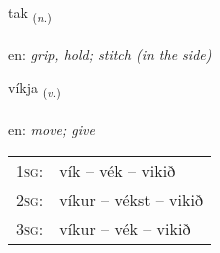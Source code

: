 \documentclass[frontgrid, backgrid]{flacards}\usepackage[]{graphicx}\usepackage[]{color}
\begin{document}
\renewcommand{\flhead}{\vskip5pt \fboxsep=0pt {\small\bfseries\footnotesize Nafnorð | Noun}}
\renewcommand{\fcfoot}{\vskip5pt \fboxsep=0pt \hspace{2pt}{\small\bfseries\footnotesize 2K}}

\renewcommand{\blhead}{\vskip5pt {\small\bfseries\footnotesize Nafnorð | Noun }}
\renewcommand{\bcfoot}{\vskip5pt \hspace{2pt}{\small\bfseries\footnotesize 2K}}


{tak \small{\textsubscript{(\textit{n.})}} \\[1ex] %
\textphonetic{[tʰaːk]} \\
en: \emph{grip, hold; stitch (in the side)} \\  [2ex]
\renewcommand*{\arraystretch}{0.8}
}

\renewcommand{\flhead}{\vskip5pt \fboxsep=0pt {\small\bfseries\footnotesize Sagnorð | Verb}}
\renewcommand{\fcfoot}{\vskip5pt \fboxsep=0pt \hspace{2pt}{\small\bfseries\footnotesize 2K}}

\renewcommand{\blhead}{\vskip5pt {\small\bfseries\footnotesize Sagnorð | Verb }}
\renewcommand{\bcfoot}{\vskip5pt \hspace{2pt}{\small\bfseries\footnotesize 2K}}


{víkja \small{\textsubscript{(\textit{v.})}} \\[1ex] %
\textphonetic{[viːca]} \\
en: \emph{move; give} \\  [2ex]
\renewcommand*{\arraystretch}{0.8}
\begin{tabular}{p{1cm}l}
\textsc{1sg}: & vík -- vék -- vikið \\ 
\textsc{2sg}: & víkur -- vékst -- vikið \\ 
\textsc{3sg}: & víkur -- vék -- vikið \\ 
\end{tabular}
}
\end{document}
